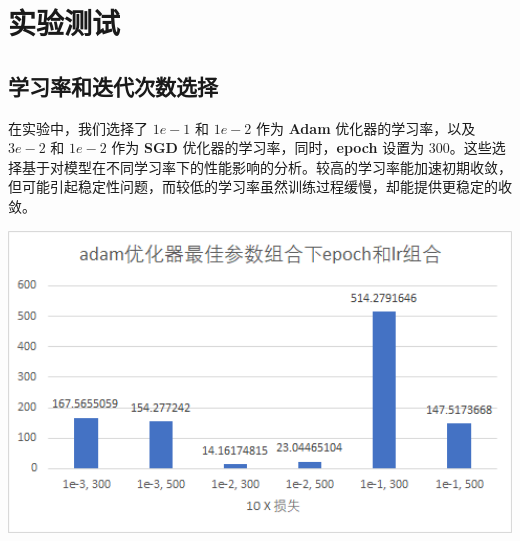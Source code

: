 \section{实验测试}
    \subsection{学习率和迭代次数选择}
        \par 在实验中，我们选择了 $1e-1$ 和 $1e-2$ 作为 \textbf{Adam} 优化器的学习率，以及 $3e-2$ 和 $1e-2$ 作为 \textbf{SGD} 优化器的学习率，同时，\textbf{epoch} 设置为 $300$。这些选择基于对模型在不同学习率下的性能影响的分析。较高的学习率能加速初期收敛，但可能引起稳定性问题，而较低的学习率虽然训练过程缓慢，却能提供更稳定的收敛。
        \begin{minipage}{\linewidth}
            \begin{center}
                \vspace*{1em}
                \includegraphics*[width = 1\textwidth]{lr_epoch.jpg}
            \end{center}
        \end{minipage} 

